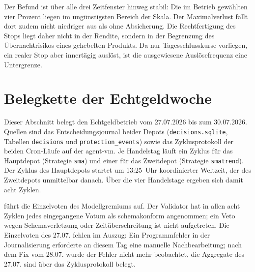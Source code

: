 Der Befund ist über alle drei Zeitfenster hinweg stabil: Die im Betrieb
gewählten vier Prozent liegen im ungünstigsten Bereich der Skala.
Der Maximalverlust fällt dort zudem nicht niedriger aus als ohne Absicherung. Die
Rechtfertigung des Stops liegt daher nicht in der Rendite, sondern in der
Begrenzung des Übernachtrisikos eines gehebelten Produkts. Da nur
Tagesschlusskurse vorliegen, ein realer Stop aber innertägig auslöst, ist die
ausgewiesene Auslösefrequenz eine Untergrenze.

\section{Belegkette der Echtgeldwoche}
\label{sec:anhang-echtgeldwoche}

Dieser Abschnitt belegt den Echtgeldbetrieb vom 27.07.2026 bis zum 30.07.2026.
Quellen sind das Entscheidungsjournal beider Depots
(\texttt{decisions.sqlite}, Tabellen \texttt{decisions} und
\texttt{protection\_events}) sowie das Zyklusprotokoll der beiden Cron-Läufe auf
der agent-vm. Je Handelstag läuft ein Zyklus für das Hauptdepot (Strategie
\texttt{sma}) und einer für das Zweitdepot (Strategie \texttt{smatrend}). Der
Zyklus des Hauptdepots startet um 13:25~Uhr koordinierter Weltzeit, der des
Zweitdepots unmittelbar danach. Über die vier Handelstage ergeben sich
damit acht Zyklen.

 führt die Einzelvoten des Modellgremiums
auf. Der Validator hat in allen acht Zyklen jedes eingegangene Votum als
schemakonform angenommen; ein Veto wegen Schemaverletzung oder Zeitüberschreitung
ist nicht aufgetreten. Die Einzelvoten des 27.07. fehlen im Auszug: Ein
Programmfehler in der Journalisierung erforderte an diesem Tag eine manuelle
Nachbearbeitung; nach dem Fix vom 28.07. wurde der Fehler nicht mehr beobachtet,
die Aggregate des 27.07. sind über das Zyklusprotokoll belegt.

